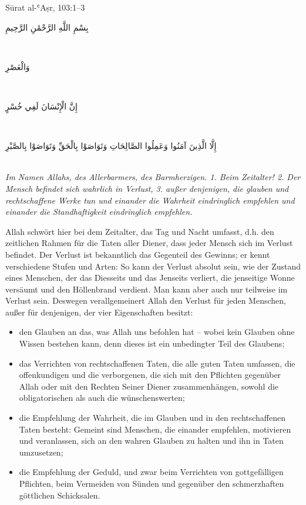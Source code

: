 \begin{quranvers}{Sūrat al-ʿAṣr, 103:1--3}
{\quranfont\begin{Arabic}
بِسْمِ اللَّهِ الرَّحْمَٰنِ الرَّحِيمِ
\end{Arabic}}\\[2mm]
{\quranfont\begin{Arabic}
وَالْعَصْرِ
\end{Arabic}}\\[2mm]
{\quranfont\begin{Arabic}
إِنَّ الْإِنْسَانَ لَفِي خُسْرٍ
\end{Arabic}}\\[2mm]
{\quranfont\begin{Arabic}
إِلَّا الَّذِينَ آمَنُوا وَعَمِلُوا الصَّالِحَاتِ وَتَوَاصَوْا بِالْحَقِّ وَتَوَاصَوْا بِالصَّبْرِ
\end{Arabic}}\\[3mm]
\emph{Im Namen Allahs, des Allerbarmers, des Barmherzigen. 1. Beim Zeitalter! 2. Der Mensch
befindet sich wahrlich in Verlust, 3. außer denjenigen, die glauben und rechtschaffene Werke tun
und einander die Wahrheit eindringlich empfehlen und einander die Standhaftigkeit eindringlich
empfehlen.}
\end{quranvers}

Allah  schwört hier bei dem Zeitalter, das Tag und Nacht umfasst, d.h. den zeitlichen
Rahmen für die Taten aller Diener, dass jeder Mensch sich im Verlust befindet. Der Verlust ist
bekanntlich das Gegenteil des Gewinns; er kennt verschiedene Stufen und Arten: So kann der
Verlust absolut sein, wie der Zustand eines Menschen, der das Diesseits und das Jenseits
verliert, die jenseitige Wonne versäumt und den Höllenbrand verdient. Man kann aber auch nur
teilweise im Verlust sein. Deswegen verallgemeinert Allah den Verlust für jeden Menschen, außer
für denjenigen, der vier Eigenschaften besitzt:

\begin{itemize}[leftmargin=1.4em]
  \item den Glauben an das, was Allah uns befohlen hat – wobei kein Glauben ohne Wissen
        bestehen kann, denn dieses ist ein unbedingter Teil des Glaubens;
  \item das Verrichten von rechtschaffenen Taten, die alle guten Taten umfassen, die
        offenkundigen und die verborgenen, die sich mit den Pflichten gegenüber Allah oder mit
        den Rechten Seiner Diener zusammenhängen, sowohl die obligatorischen als auch die
        wünschenswerten;
  \item die Empfehlung der Wahrheit, die im Glauben und in den rechtschaffenen Taten besteht:
        Gemeint sind Menschen, die einander empfehlen, motivieren und veranlassen, sich an
        den wahren Glauben zu halten und ihn in Taten umzusetzen;
  \item die Empfehlung der Geduld, und zwar beim Verrichten von gottgefälligen Pflichten, beim
        Vermeiden von Sünden und gegenüber den schmerzhaften göttlichen Schicksalen.
\end{itemize}

